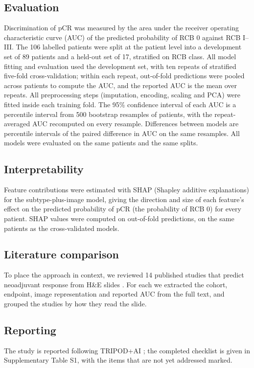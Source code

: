 \documentclass[10pt,a4paper,twocolumn]{article}
\begin{document}
\subsection{Evaluation}
Discrimination of pCR was measured by the area under the receiver operating characteristic curve (AUC) of the predicted probability of RCB 0 against RCB I--III. The 106 labelled patients were split at the patient level into a development set of 89 patients and a held-out set of 17, stratified on RCB class. All model fitting and evaluation used the development set, with ten repeats of stratified five-fold cross-validation; within each repeat, out-of-fold predictions were pooled across patients to compute the AUC, and the reported AUC is the mean over repeats. All preprocessing steps (imputation, encoding, scaling and PCA) were fitted inside each training fold. The 95\% confidence interval of each AUC is a percentile interval from 500 bootstrap resamples of patients, with the repeat-averaged AUC recomputed on every resample. Differences between models are percentile intervals of the paired difference in AUC on the same resamples. All models were evaluated on the same patients and the same splits.

\subsection{Interpretability}
Feature contributions were estimated with SHAP (Shapley additive explanations) \cite{lundberg2017} for the subtype-plus-image model, giving the direction and size of each feature's effect on the predicted probability of pCR (the probability of RCB 0) for every patient. SHAP values were computed on out-of-fold predictions, on the same patients as the cross-validated models.

\subsection{Literature comparison}
To place the approach in context, we reviewed 14 published studies that predict neoadjuvant response from H\&E slides \cite{dodington2021,saednia2022,huang2023,aswolinskiy2023,cui2026,li2021,li2022,zeng2024,sturm2025,valderrama2026,lin2026,khan2025,hou2026,zhou2026}. For each we extracted the cohort, endpoint, image representation and reported AUC from the full text, and grouped the studies by how they read the slide.

\subsection{Reporting}
The study is reported following TRIPOD+AI \cite{collins2024}; the completed checklist is given in Supplementary Table S1, with the items that are not yet addressed marked.
\end{document}

